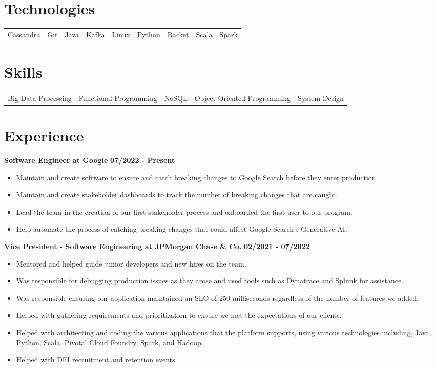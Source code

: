 \documentclass{res}
\begin{document}
\address{www.anthonyhicksiii.com}
\address{ahicks3rd@gmail.com}

\setlength\itemsep{0em}

\begin{resume}
\section{\large{Technologies}}
\begin{tabular}{	l	l	l 	l	l	l	l	l	l	}
	Cassandra  & Git  & Java & Kafka & Linux & Python & Racket & Scala & Spark
\end{tabular}

\section{\large{Skills}}
\begin{tabular}{	l 	l 	l 	l	l 	}
	Big Data Processing & Functional Programming & NoSQL & Object-Oriented Programming & System Design
\end{tabular}

\section{\large{Experience}}
	\textbf{Software Engineer at Google}
	\hfill{\bf 07/2022 - Present}
	\begin{itemize}
		\item Maintain and create software to ensure and catch breaking changes to Google Search before they enter production.
		\item Maintain and create stakeholder dashboards to track the number of breaking changes that are caught.
		\item Lead the team in the creation of our first stakeholder process and onboarded the first user to our program.
		\item Help automate the process of catching breaking changes that could affect Google Search's Generative AI.
	\end{itemize}
	
	\textbf{Vice President - Software Engineering at JPMorgan Chase \& Co.}
	\hfill{\bf 02/2021 - 07/2022}
	\begin{itemize}
		\item Mentored and helped guide junior developers and new hires on the team.
		\item Was responsible for debugging production issues as they arose and used tools such as Dynatrace and Splunk for
assistance.
		\item Was responsible ensuring our application maintained an SLO of 250 milliseconds regardless of the number of features we added.
		\item Helped with gathering requirements and prioritization to ensure we met the expectations of our clients.
		\item Helped with architecting and coding the various applications that the platform supports, using various technologies
including, Java, Python, Scala, Pivotal Cloud Foundry, Spark, and Hadoop.		
		\item Helped with DEI recruitment and retention events.
	\end{itemize}
	

\end{resume}
\end{document}
